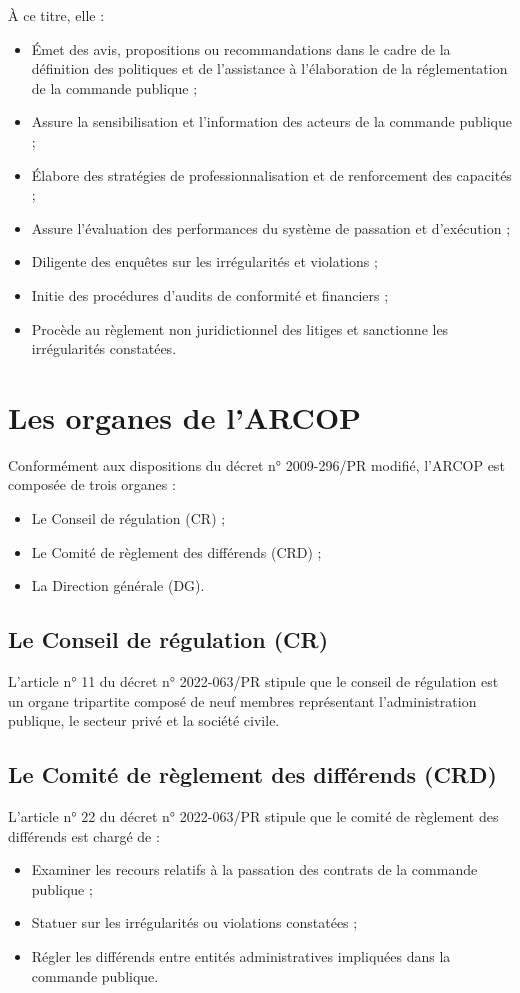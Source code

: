 À ce titre, elle :
\begin{itemize}
    \item Émet des avis, propositions ou recommandations dans le cadre de la définition des politiques et de l'assistance à l'élaboration de la réglementation de la commande publique ;
    \item Assure la sensibilisation et l'information des acteurs de la commande publique ;
    \item Élabore des stratégies de professionnalisation et de renforcement des capacités ;
    \item Assure l’évaluation des performances du système de passation et d’exécution ;
    \item Diligente des enquêtes sur les irrégularités et violations ;
    \item Initie des procédures d'audits de conformité et financiers ;
    \item Procède au règlement non juridictionnel des litiges et sanctionne les irrégularités constatées.
\end{itemize}

\section{Les organes de l’\acs{ARCOP}}
Conformément aux dispositions du décret n° 2009-296/PR modifié, l’\ac{ARCOP} est composée de trois organes :
\begin{itemize}
    \item Le Conseil de régulation (CR) ;
    \item Le Comité de règlement des différends (CRD) ;
    \item La Direction générale (DG).
\end{itemize}

\subsection{Le Conseil de régulation (CR)}
L’article n° 11 du décret n° 2022-063/PR stipule que le conseil de régulation est un organe tripartite composé de neuf membres représentant l’administration publique, le secteur privé et la société civile.

\subsection{Le Comité de règlement des différends (CRD)}
L’article n° 22 du décret n° 2022-063/PR stipule que le comité de règlement des différends est chargé de :
\begin{itemize}
    \item Examiner les recours relatifs à la passation des contrats de la commande publique ;
    \item Statuer sur les irrégularités ou violations constatées ;
    \item Régler les différends entre entités administratives impliquées dans la commande publique.
\end{itemize}

